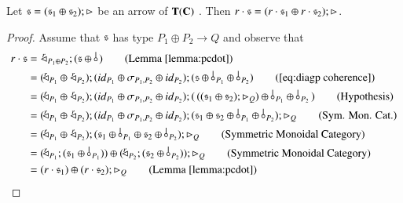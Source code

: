 \begin{lemma}\label{lemma:pcopairing}
Let $\mathfrak{s} = (\mathfrak{s}_1 \oplus \mathfrak{s}_2) ; \rhd_{}$ be an arrow of $\mathbf{T}(\mathbf{C})$ . 
Then $r \cdot \mathfrak{s} = (r\cdot \mathfrak{s}_1 \oplus r\cdot \mathfrak{s}_2); \rhd_{}$. 
\end{lemma}
\begin{proof}
Assume that $\mathfrak{s}$ has type $P_1\oplus P_2 \to Q$ and observe that
\begin{align*}
r \cdot \s &=\, \diagpX{r}{P_1\oplus P_2} ; (\s \oplus \bang{}) \tag{Lemma \ref{lemma:pcdot}}\\
&= (\diagpX{r}{P_1} \oplus\, \diagpX{r}{P_2} ) ; (\id{P_1}\oplus \symm{P_1}{P_2} \oplus \id{P_2}) ; (\s \oplus \bang{P_1}\oplus \bang{P_2}) \tag{\ref{eq:diagp coherence}}\\
&= (\diagpX{r}{P_1} \oplus\, \diagpX{r}{ P_2} ) ; (\id{P_1}\oplus \symm{P_1}{P_2} \oplus \id{P_2}) ; (\, ((\s_1 \oplus \s_2) ; \codiag{Q}) \oplus \bang{P_1}\oplus \bang{P_2}\,) \tag{Hypothesis}\\
&= (\diagpX{r}{P_1} \oplus\, \diagpX{r}{P_2} ) ; (\id{P_1}\oplus \symm{P_1}{P_2} \oplus \id{P_2}) ; ( \s_1 \oplus \s_2  \oplus \bang{P_1}\oplus \bang{P_2}); \codiag{Q} \tag{Sym. Mon. Cat.}\\
&= (\diagpX{r}{P_1} \oplus\, \diagpX{r}{ P_2} ) ;( \s_1 \oplus \bang{P_1} \oplus \s_2   \oplus \bang{P_2}); \codiag{Q} \tag{Symmetric Monoidal Category}\\
&= (\diagpX{r}{P_1} ; ( \s_1 \oplus \bang{P_1})) \oplus (\diagpX{r}{ P_2}  ;( \s_2   \oplus \bang{P_2})); \codiag{Q} \tag{Symmetric Monoidal Category}\\
&= (r\cdot \s_1 ) \oplus (r\cdot  \s_2 ); \codiag{Q} \tag{Lemma \ref{lemma:pcdot}}
\end{align*}
\end{proof}


